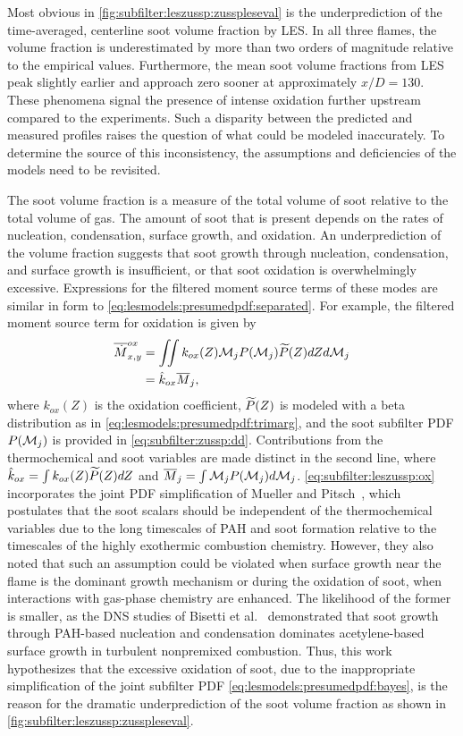 Most obvious in \cref{fig:subfilter:leszussp:zusspleseval} is the underprediction of the time-averaged, centerline soot volume fraction by LES. In all three flames, the volume fraction is underestimated by more than two orders of magnitude relative to the empirical values. Furthermore, the mean soot volume fractions from LES peak slightly earlier and approach zero sooner at approximately $x/D = 130$. These phenomena signal the presence of intense oxidation further upstream compared to the experiments. Such a disparity between the predicted and measured profiles raises the question of what could be modeled inaccurately. To determine the source of this inconsistency, the assumptions and deficiencies of the models need to be revisited.

The soot volume fraction is a measure of the total volume of soot relative to the total volume of gas. The amount of soot that is present depends on the rates of nucleation, condensation, surface growth, and oxidation. An underprediction of the volume fraction suggests that soot growth through nucleation, condensation, and surface growth is insufficient, or that soot oxidation is overwhelmingly excessive. Expressions for the filtered moment source terms of these modes are similar in form to \cref{eq:lesmodels:presumedpdf:separated}. For example, the filtered moment source term for oxidation is given by
\begin{equation}\label{eq:subfilter:leszussp:ox}
  \begin{split}
    \overline{\dot{M}}_{x,y}^{ox} &= \iint k_{ox}(Z)\mathcal{M}_j P(\mathcal{M}_j)\widetilde{P}(Z) dZ d\mathcal{M}_j \\
    &= \hat{k}_{ox}\overline{M}_j,
  \end{split}
\end{equation}
where $k_{ox}(Z)$ is the oxidation coefficient, $\widetilde{P}(Z)$ is modeled with a beta distribution as in \cref{eq:lesmodels:presumedpdf:trimarg}, and the soot subfilter PDF $P(\mathcal{M}_j)$ is provided in \cref{eq:subfilter:zussp:dd}. Contributions from the thermochemical and soot variables are made distinct in the second line, where $\hat{k}_{ox} = \int k_{ox}(Z)\widetilde{P}(Z) dZ$ and $\overline{M}_j = \int \mathcal{M}_j P(\mathcal{M}_j)d\mathcal{M}_j$. \cref{eq:subfilter:leszussp:ox} incorporates the joint PDF simplification of Mueller and Pitsch~\cite{subfilterpdf2011}, which postulates that the soot scalars should be independent of the thermochemical variables due to the long timescales of PAH and soot formation relative to the timescales of the highly exothermic combustion chemistry. However, they also noted that such an assumption could be violated when surface growth near the flame is the dominant growth mechanism or during the oxidation of soot, when interactions with gas-phase chemistry are enhanced. The likelihood of the former is smaller, as the DNS studies of Bisetti et al.~\cite{bisetti2012} demonstrated that soot growth through PAH-based nucleation and condensation dominates acetylene-based surface growth in turbulent nonpremixed combustion. Thus, this work hypothesizes that the excessive oxidation of soot, due to the inappropriate simplification of the joint subfilter PDF \cref{eq:lesmodels:presumedpdf:bayes}, is the reason for the dramatic underprediction of the soot volume fraction as shown in \cref{fig:subfilter:leszussp:zusspleseval}.

